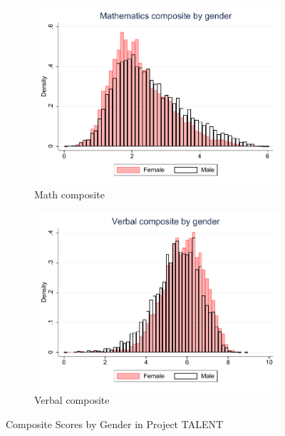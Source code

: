 \documentclass[onehalfspacing,11pt]{article}
\begin{document}
\begin{figure}
	\begin{subfigure}{0.49\textwidth}
		\includegraphics[width=\linewidth]{TALENT_Mathematics_gender.pdf}
		\caption{Math composite} \label{fig:nlsy79}
	\end{subfigure}
	\hspace*{\fill} %
	\begin{subfigure}{0.49\textwidth}
		\includegraphics[width=\linewidth]{TALENT_Verbal_gender.pdf}
		\caption{Verbal composite} \label{fig:nlsy97bygender}
	\end{subfigure}
	\caption{Composite Scores by Gender in Project TALENT} \label{fig:talent_gender}
\end{figure}
\end{document}
